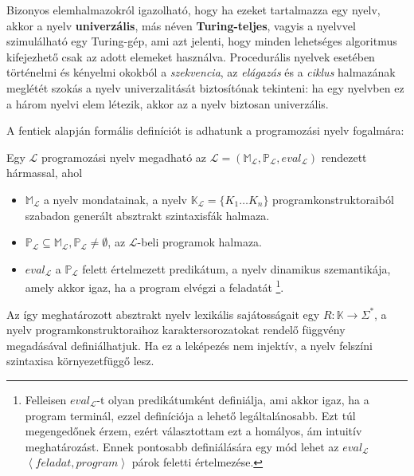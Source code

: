 Bizonyos elemhalmazokról igazolható, hogy ha ezeket tartalmazza egy nyelv, akkor a nyelv \textbf{univerzális}, más néven \textbf{Turing-teljes}, vagyis a nyelvvel szimulálható egy Turing-gép, ami azt jelenti, hogy minden lehetséges algoritmus kifejezhető csak az adott elemeket használva.
Procedurális nyelvek esetében történelmi és kényelmi okokból a \textit{szekvencia}, az \textit{elágazás} és a \textit{ciklus} halmazának meglétét szokás a nyelv univerzalitását biztosítónak tekinteni: ha egy nyelvben ez a három nyelvi elem létezik, akkor az a nyelv biztosan univerzális\cite{Fothi}.

\bigskip

\noindent A fentiek alapján formális definíciót is adhatunk a programozási nyelv fogalmára:
\begin{defn}
	Egy $\mathcal{L}$ programozási nyelv megadható az $\mathcal{L} = (
		\mathbb{M}_\mathcal{L},
		\mathbb{P}_\mathcal{L},
		eval_\mathcal{L}
	)$ rendezett hármassal, ahol
	\begin{itemize}
		\item $\mathbb{M}_\mathcal{L}$ a nyelv mondatainak, a nyelv $\mathbb{K}_\mathcal{L} = \{K_1 \ldots K_n\}$ programkonstruktoraiból szabadon generált absztrakt szintaxisfák halmaza.
		\item $\mathbb{P}_\mathcal{L} \subseteq \mathbb{M}_\mathcal{L}, \mathbb{P}_\mathcal{L} \not= \emptyset$, az $\mathcal{L}$-beli programok halmaza.
		\item $eval_{\mathcal{L}}$ a $\mathbb{P}_\mathcal{L}$ felett értelmezett predikátum, a nyelv dinamikus szemantikája, amely akkor igaz, ha a program elvégzi a feladatát%
		\footnote{
Felleisen $eval_\mathcal{L}$-t olyan predikátumként definiálja, ami akkor igaz, ha a program terminál\cite{Felleisen90}, ezzel  definíciója a lehető legáltalánosabb. Ezt túl megengedőnek érzem, ezért választottam ezt a homályos, ám intuitív meghatározást. Ennek pontosabb definiálására egy mód lehet az $eval_\mathcal{L}$ $\left<feladat, program\right>$ párok feletti értelmezése.
		}.
	\end{itemize}

	\normalfont Az így meghatározott absztrakt nyelv lexikális sajátosságait egy $R: \mathbb{K} \rightarrow \Sigma^*$, a nyelv programkonstruktoraihoz karaktersorozatokat rendelő függvény megadásával definiálhatjuk. Ha ez a leképezés nem injektív, a nyelv felszíni szintaxisa környezetfüggő lesz.
\end{defn}


